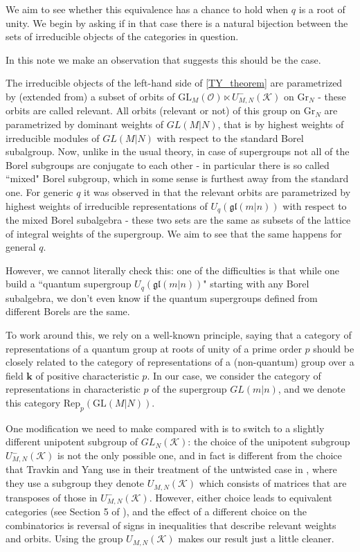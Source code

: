 \documentclass[12pt]{amsart}
\numberwithin{equation}{section}
\numberwithin{equation}{section}
\theoremstyle{definition}
\begin{document}
 We aim to see whether this equivalence has a chance to hold when $q$ is a root of unity. We begin by asking if in that case there is a natural bijection between the sets of irreducible objects of the categories in question. 

 
In this note we make an observation that suggests this should be the case.

The irreducible objects of the left-hand side of \ref{TY_theorem} are parametrized by (extended from) a subset of orbits of $\mathrm{GL}_M(\mathcal{O}) \ltimes U_{M,N}^{-}(\mathcal{K})$ on $\mathrm{Gr}_N$ - these orbits are called relevant. All orbits (relevant or not) of this group on $\mathrm{Gr}_N$ are parametrized by dominant weights of $GL(M|N)$, that is by highest weights of irreducible modules of $GL(M|N)$ with respect to the standard Borel subalgroup. Now, unlike in the usual theory, in case of supergroups not all of the Borel subgroups are conjugate to each other - in particular there is so called ``mixed" Borel subgroup, which in some sense is furthest away from the standard one. For generic $q$ it was observed in \cite{ty} that the relevant orbits are parametrized by highest weights of irreducible representations of $U_q(\mathfrak{gl}(m|n))$ with respect to the mixed Borel subalgebra - these two sets are the same as subsets of the lattice of integral weights of the supergroup. We aim to see that the same happens for general $q$. 

However, we cannot literally check this: one of the difficulties is that while one build a ``quantum supergroup $U_q(\mathfrak{gl}(m|n))$" starting with any Borel subalgebra, we don't even know if the quantum supergroups defined from different Borels are the same.

To work around this, we rely on a well-known principle, saying that a category of representations of a quantum group at roots of unity of a prime order $p$ should be closely related to the category of representations of a (non-quantum) group over a field $\mathbf{k}$ of positive characteristic $p$. In our case, we consider the category of representations in characteristic $p$ of the supergroup $GL(m|n)$, and we denote this category $\mathrm{Rep}_p(\mathrm{GL}(M|N))$. 

One modification we need to make compared with \cite{ty} is to switch to a slightly different unipotent subgroup of $GL_N(\mathcal{K})$: the choice of the unipotent subgroup $U_{M,N}^-(\mathcal{K})$ is not the only possible one, and in fact is different from the choice that Travkin and Yang use in their treatment of the untwisted case in \cite{ty_untwisted}, where they use a subgroup they denote $U_{M,N}(\mathcal{K})$ which consists of matrices that are transposes of those in $U_{M,N}^-(\mathcal{K})$. However, either choice leads to equivalent categories (see Section 5 of \cite{ty_untwisted}), and the effect of a different choice on the combinatorics is reversal of signs in inequalities that describe relevant weights and orbits. Using the group $U_{M,N}(\mathcal{K})$ makes our result just a little cleaner.
\end{document}
